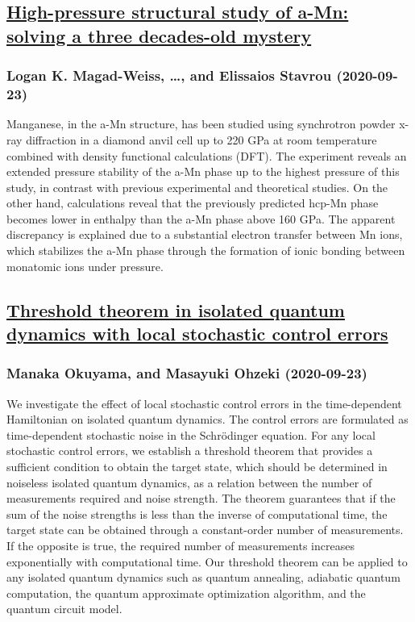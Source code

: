 \subsection*{\href{http://arxiv.org/abs/2009.11153v1}{High-pressure structural study of a-Mn: solving a three decades-old  mystery}}
\subsubsection*{Logan K. Magad-Weiss, \dots, and Elissaios Stavrou (2020-09-23)}
Manganese, in the a-Mn structure, has been studied using synchrotron powder
x-ray diffraction in a diamond anvil cell up to 220 GPa at room temperature
combined with density functional calculations (DFT). The experiment reveals an
extended pressure stability of the a-Mn phase up to the highest pressure of
this study, in contrast with previous experimental and theoretical studies. On
the other hand, calculations reveal that the previously predicted hcp-Mn phase
becomes lower in enthalpy than the a-Mn phase above 160 GPa. The apparent
discrepancy is explained due to a substantial electron transfer between Mn
ions, which stabilizes the a-Mn phase through the formation of ionic bonding
between monatomic ions under pressure.

\subsection*{\href{http://arxiv.org/abs/2009.11151v1}{Threshold theorem in isolated quantum dynamics with local stochastic  control errors}}
\subsubsection*{Manaka Okuyama, and Masayuki Ohzeki (2020-09-23)}
We investigate the effect of local stochastic control errors in the
time-dependent Hamiltonian on isolated quantum dynamics. The control errors are
formulated as time-dependent stochastic noise in the Schr\"odinger equation.
For any local stochastic control errors, we establish a threshold theorem that
provides a sufficient condition to obtain the target state, which should be
determined in noiseless isolated quantum dynamics, as a relation between the
number of measurements required and noise strength. The theorem guarantees that
if the sum of the noise strengths is less than the inverse of computational
time, the target state can be obtained through a constant-order number of
measurements. If the opposite is true, the required number of measurements
increases exponentially with computational time. Our threshold theorem can be
applied to any isolated quantum dynamics such as quantum annealing, adiabatic
quantum computation, the quantum approximate optimization algorithm, and the
quantum circuit model.

